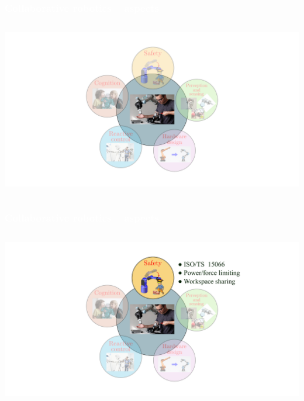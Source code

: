 \begin{frame}[noframenumbering]
  \frametitle{{\textcolor{white}{\hspace{0.3cm}Collaborative robotics -- aspects}}}


\begin{columns}

\column{1.2\paperwidth}

\hspace{-15mm}                       
\includegraphics[width=1.2\paperwidth ]{figures/1.pdf}

\end{columns}




\end{frame}

\begin{frame}[noframenumbering]
  \frametitle{{\textcolor{white}{\hspace{0.3cm}Collaborative robotics -- aspects}}}


\begin{columns}

\column{1.2\paperwidth}

\hspace{-15mm}               
\includegraphics[width=1.2\paperwidth ]{figures/2.pdf}
      

\end{columns}




\end{frame}

